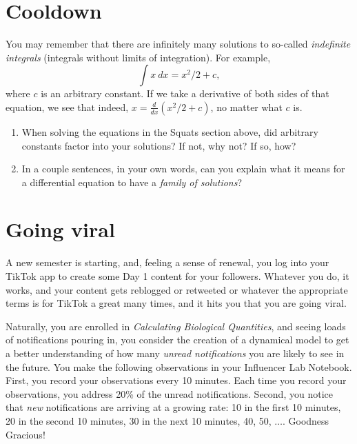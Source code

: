 \documentclass[11pt,onecolumn,superscriptaddress,notitlepage]{article}
\begin{document}
\section*{Cooldown}
You may remember that there are infinitely many solutions to so-called {\it indefinite integrals} (integrals without limits of integration). For example, $$\int x \ dx = x^{2}/2 + c,$$ where $c$ is an arbitrary constant. If we take a derivative of both sides of that equation, we see that indeed, $x = \frac{d}{dx} \left(x^2/2+c\right)$, no matter what $c$ is.
\begin{enumerate}[resume]
	\item When solving the equations in the Squats section above, did arbitrary constants factor into your solutions? If not, why not? If so, how?
	\item In a couple sentences, in your own words, can you explain what it means for a differential equation to have a {\it family of solutions}?  
\end{enumerate}

\clearpage
\section*{Going viral}

A new semester is starting, and, feeling a sense of renewal, you log into your TikTok app to create some Day 1 content for your followers. Whatever you do, it works, and your content gets reblogged or retweeted or whatever the appropriate terms is for TikTok a great many times, and it hits you that you are going viral.  

Naturally, you are enrolled in {\it Calculating Biological Quantities}, and seeing loads of notifications pouring in, you consider the creation of a dynamical model to get a better understanding of how many {\it unread notifications} you are likely to see in the future. You make the following observations in your Influencer Lab Notebook. First, you record your observations every 10 minutes. Each time you record your observations, you address 20\% of the unread notifications. Second, you notice that {\it new} notifications are arriving at a growing rate: 10 in the first 10 minutes, 20 in the second 10 minutes, 30 in the next 10 minutes, 40, 50, $\dots$. Goodness Gracious! 
\end{document}
